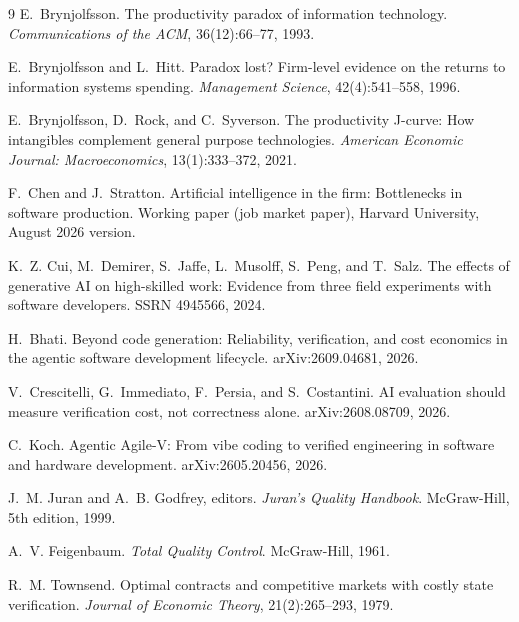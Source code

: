 \documentclass[11pt]{article}
\begin{document}
\begin{thebibliography}{9}
E.~Brynjolfsson. The productivity paradox of information technology.
\emph{Communications of the ACM}, 36(12):66--77, 1993.

E.~Brynjolfsson and L.~Hitt. Paradox lost? Firm-level evidence on the returns to information
systems spending. \emph{Management Science}, 42(4):541--558, 1996.

E.~Brynjolfsson, D.~Rock, and C.~Syverson. The productivity J-curve: How intangibles complement
general purpose technologies. \emph{American Economic Journal: Macroeconomics}, 13(1):333--372,
2021.

F.~Chen and J.~Stratton. Artificial intelligence in the firm: Bottlenecks in software production.
Working paper (job market paper), Harvard University, August 2026 version.

K.~Z. Cui, M.~Demirer, S.~Jaffe, L.~Musolff, S.~Peng, and T.~Salz. The effects of generative AI on
high-skilled work: Evidence from three field experiments with software developers. SSRN 4945566,
2024.

H.~Bhati. Beyond code generation: Reliability, verification, and cost economics in the agentic
software development lifecycle. arXiv:2609.04681, 2026.

V.~Crescitelli, G.~Immediato, F.~Persia, and S.~Costantini. AI evaluation should measure
verification cost, not correctness alone. arXiv:2608.08709, 2026.

C.~Koch. Agentic Agile-V: From vibe coding to verified engineering in software and hardware
development. arXiv:2605.20456, 2026.

J.~M. Juran and A.~B. Godfrey, editors. \emph{Juran's Quality Handbook}. McGraw-Hill, 5th
edition, 1999.

A.~V. Feigenbaum. \emph{Total Quality Control}. McGraw-Hill, 1961.

R.~M. Townsend. Optimal contracts and competitive markets with costly state verification.
\emph{Journal of Economic Theory}, 21(2):265--293, 1979.


\end{thebibliography}
\end{document}
